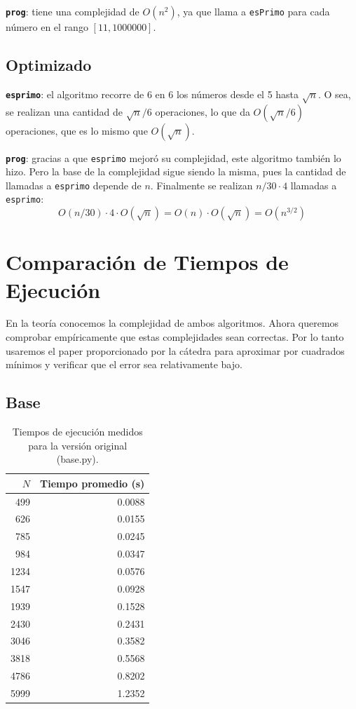 \documentclass[12pt,a4paper]{article}
\begin{document}
\textbf{\texttt{prog}}: tiene una complejidad de $O(n^2)$, ya que llama a \texttt{esPrimo} para cada número en el rango $[11, 1000000]$.

\subsection{Optimizado}

\textbf{\texttt{esprimo}}: el algoritmo recorre de 6 en 6 los números desde el 5 hasta $\sqrt{n}$. O sea, se realizan una cantidad de $\sqrt{n} / 6$ operaciones, lo que da $O(\sqrt{n} / 6)$ operaciones, que es lo mismo que $O(\sqrt{n})$.

\textbf{\texttt{prog}}: gracias a que \texttt{esprimo} mejoró su complejidad, este algoritmo también lo hizo. Pero la base de la complejidad sigue siendo la misma, pues la cantidad de llamadas a \texttt{esprimo} depende de $n$. Finalmente se realizan $n/30 \cdot 4$ llamadas a \texttt{esprimo}:
\[
O(n/30) \cdot 4 \cdot O(\sqrt{n}) = O(n) \cdot O(\sqrt{n}) = O(n^{3/2})
\]

\section{Comparación de Tiempos de Ejecución}

En la teoría conocemos la complejidad de ambos algoritmos. Ahora queremos comprobar empíricamente que estas complejidades sean correctas. Por lo tanto usaremos el paper proporcionado por la cátedra para aproximar por cuadrados mínimos y verificar que el error sea relativamente bajo.

\subsection{Base}

\begin{table}[H]
\centering
\caption{Tiempos de ejecución medidos para la versión original (base.py).}
\begin{tabular}{@{}rr@{}}
\toprule
$N$ & Tiempo promedio (s) \\
\midrule
499  & 0.0088 \\
626  & 0.0155 \\
785  & 0.0245 \\
984  & 0.0347 \\
1234 & 0.0576 \\
1547 & 0.0928 \\
1939 & 0.1528 \\
2430 & 0.2431 \\
3046 & 0.3582 \\
3818 & 0.5568 \\
4786 & 0.8202 \\
5999 & 1.2352 \\
\bottomrule
\end{tabular}
\end{table}
\end{document}
